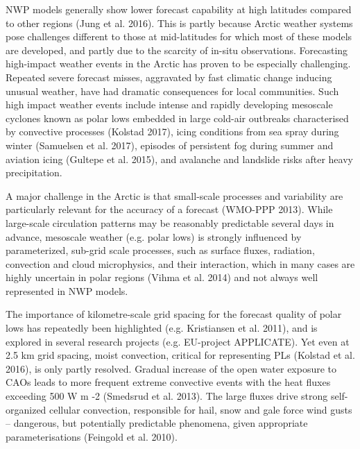\documentclass[a4paper,10pt]{article}
\begin{document}
NWP models generally show lower forecast capability at high latitudes compared to other regions (Jung et al. 2016). This is partly because Arctic weather systems pose challenges different to those at mid-latitudes for which most of these models are developed, and partly due to the scarcity of in-situ observations. Forecasting high-impact weather events in the Arctic has proven to be especially challenging. Repeated severe forecast misses, aggravated by fast climatic change inducing unusual weather, have had dramatic consequences for local communities. Such high impact weather events include intense and rapidly developing mesoscale cyclones known as polar lows embedded in large cold-air outbreaks characterised by convective processes (Kolstad 2017), icing conditions from sea spray during winter (Samuelsen et al. 2017), episodes of persistent fog during summer and aviation icing (Gultepe et al. 2015), and avalanche and landslide risks after heavy precipitation. %

A major challenge in the Arctic is that small-scale processes and variability are particularly relevant for the accuracy of a forecast (WMO-PPP 2013). While large-scale circulation patterns may be reasonably predictable several days in advance, mesoscale weather (e.g. polar lows) is strongly influenced by parameterized, sub-grid scale processes, such as surface fluxes, radiation, convection and cloud microphysics, and their interaction, which in many cases are highly uncertain in polar regions (Vihma et al. 2014) and not always well represented in NWP models.

 The importance of kilometre-scale grid spacing for the forecast quality of polar lows has repeatedly been highlighted (e.g. Kristiansen et al. 2011), and is explored in several research projects (e.g. EU-project APPLICATE). Yet even at 2.5 km grid spacing, moist convection, critical for representing PLs (Kolstad et al. 2016), is only partly resolved. Gradual increase of the open water exposure to CAOs leads to more frequent extreme convective events with the heat fluxes exceeding 500 W m -2 (Smedsrud et al. 2013). The large fluxes drive strong self-organized cellular convection, responsible for hail, snow and gale force wind gusts – dangerous, but potentially predictable phenomena, given appropriate parameterisations (Feingold et al. 2010). 
\end{document}

